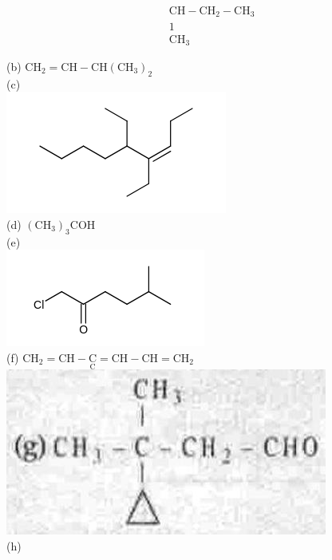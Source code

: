\documentclass[10pt]{article}
\begin{document}
$$
\begin{aligned}
& \mathrm{CH}-\mathrm{CH}_{2}-\mathrm{CH}_{3} \\
& 1 \\
& \mathrm{CH}_{3}
\end{aligned}
$$

(b) $\mathrm{CH}_{2}=\mathrm{CH}-\mathrm{CH}\left(\mathrm{CH}_{3}\right)_{2}$\\
(c)\\
\includegraphics{smile-632e4ff969fae7e5b8edd95f85dbc346f4a302f1}\\
(d) $\left(\mathrm{CH}_{3}\right)_{3} \mathrm{COH}$\\
(e)\\
\includegraphics{smile-48e970762d52ee76b1fee173c89aaba8de229443}\\
(f) $\mathrm{CH}_{2}=\mathrm{CH}-\underset{\mathrm{C}}{\mathrm{C}}=\mathrm{CH}-\mathrm{CH}=\mathrm{CH}_{2}$\\
\includegraphics[max width=\textwidth, center]{2025_01_28_8470952b98110cec3aabg-037(1)}\\
(h)\\
\end{document}
